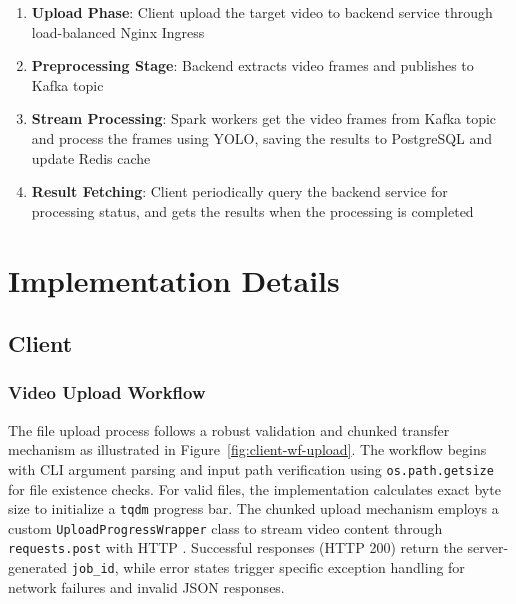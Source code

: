 \documentclass[10pt,a4paper]{article}
\begin{document}
\begin{enumerate}
    \item \textbf{Upload Phase}: Client upload the target video to backend service through load-balanced Nginx Ingress
    \item \textbf{Preprocessing Stage}: Backend extracts video frames and publishes to Kafka topic
    \item \textbf{Stream Processing}: Spark workers get the video frames from Kafka topic and process the frames using YOLO, saving the results to PostgreSQL and update Redis cache
    \item \textbf{Result Fetching}: Client periodically query the backend service for processing status, and gets the results when the processing is completed
\end{enumerate}

\section{Implementation Details}
\subsection{Client}

\subsubsection{Video Upload Workflow}
The file upload process follows a robust validation and chunked transfer mechanism as illustrated in Figure~\ref{fig:client-wf-upload}. The workflow begins with CLI argument parsing and input path verification using \texttt{os.path.getsize} for file existence checks. For valid files, the implementation calculates exact byte size to initialize a \texttt{tqdm} \cite{tqdm_docs} progress bar. The chunked upload mechanism employs a custom \texttt{UploadProgressWrapper} class to stream video content through \texttt{requests.post} with HTTP \cite{python_requests_upload}. Successful responses (HTTP 200) return the server-generated \texttt{job\_id}, while error states trigger specific exception handling for network failures and invalid JSON responses.
\end{document}
